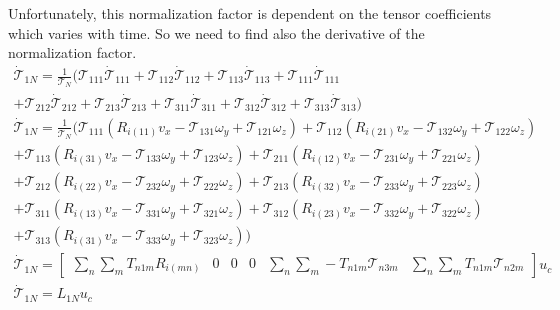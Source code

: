 Unfortunately, this normalization factor is dependent on the tensor coefficients which varies with time. So we need to find also the derivative of the normalization factor.
\begin{equation}
  \begin{gathered}
    \dot{\mathcal{T}}_{1N} = \frac{1}{\mathcal{T}_{N}}(\mathcal{T}_{111}\dot{\mathcal{T}}_{111} + \mathcal{T}_{112}\dot{\mathcal{T}}_{112} + \mathcal{T}_{113}\dot{\mathcal{T}}_{113}+\mathcal{T}_{111}\dot{\mathcal{T}}_{111} \\+ \mathcal{T}_{212}\dot{\mathcal{T}}_{212} + \mathcal{T}_{213}\dot{\mathcal{T}}_{213}+\mathcal{T}_{311}\dot{\mathcal{T}}_{311} + \mathcal{T}_{312}\dot{\mathcal{T}}_{312} + \mathcal{T}_{313}\dot{\mathcal{T}}_{313})\\
    \dot{\mathcal{T}}_{1N} = \frac{1}{\mathcal{T}_{N}}(\mathcal{T}_{111}(R_{i(11)} v_x - \mathcal{T}_{131} \omega_y + \mathcal{T}_{121} \omega_z) + \mathcal{T}_{112}(R_{i(21)} v_x - \mathcal{T}_{132} \omega_y + \mathcal{T}_{122} \omega_z) \\+ \mathcal{T}_{113}(R_{i(31)} v_x - \mathcal{T}_{133} \omega_y + \mathcal{T}_{123} \omega_z) + \mathcal{T}_{211}(R_{i(12)} v_x - \mathcal{T}_{231} \omega_y + \mathcal{T}_{221} \omega_z) \\+ \mathcal{T}_{212}(R_{i(22)} v_x - \mathcal{T}_{232} \omega_y + \mathcal{T}_{222} \omega_z) + \mathcal{T}_{213}(R_{i(32)} v_x - \mathcal{T}_{233} \omega_y + \mathcal{T}_{223} \omega_z)\\ +\mathcal{T}_{311}(R_{i(13)} v_x - \mathcal{T}_{331} \omega_y + \mathcal{T}_{321} \omega_z) + \mathcal{T}_{312}(R_{i(23)} v_x - \mathcal{T}_{332} \omega_y + \mathcal{T}_{322} \omega_z) \\+ \mathcal{T}_{313}(R_{i(31)} v_x - \mathcal{T}_{333} \omega_y + \mathcal{T}_{323} \omega_z))\\
  \dot{\mathcal{T}}_{1N} = \begin{bmatrix}\sum_{n} \sum_{m} T_{n1m}R_{i(mn)}& 0 & 0 & 0 & \sum_{n} \sum_{m}-T_{n1m}\mathcal{T}_{n3m} & \sum_{n} \sum_{m} T_{n1m}\mathcal{T}_{n2m}\end{bmatrix} u_c\\
    \dot{\mathcal{T}}_{1N} = L_{1N} u_c\\
  \end{gathered}
\end{equation}

